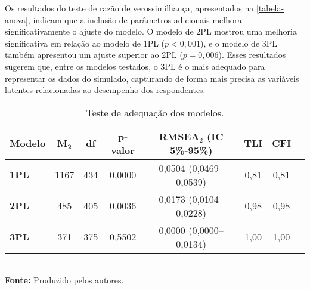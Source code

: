 Os resultados do teste de razão de verossimilhança, apresentados na \ref{tabela-anova}, indicam que a inclusão de parâmetros adicionais melhora significativamente o ajuste do modelo. O modelo de 2PL mostrou uma melhoria significativa em relação ao modelo de 1PL ($p < 0,001$), e o modelo de 3PL também apresentou um ajuste superior ao 2PL ($p = 0,006$). Esses resultados sugerem que, entre os modelos testados, o 3PL é o mais adequado para representar os dados do simulado, capturando de forma mais precisa as variáveis latentes relacionadas ao desempenho dos respondentes.
\begin{comment}
	conteúdo...\begin{table}[!htb]
		\centering
		\caption{Teste de adequação dos modelos. }
		\label{tabela-Mm2}
		\begin{tabular}{lcccccccc}
			\hline
			\textbf{Modelo} & \textbf{M}$_\textbf{2}$ & \textbf{df} &\textbf{ p-valor} & \textbf{
				
				
				
				$_\textbf{2}$} &
			\textbf{RMSEA$_{\text{5\%}}$} & \textbf{RMSEA$_{{\text{95\%}}}$} &
			\textbf{TLI} & \textbf{CFI} \\ 
			\hline 
			\textbf{1PL} & 1167 & 434 & 0,0000 & 0,0504 & 0,0469 & 0,0539 & 0,81 & 0,81 \\ 
			\hline
			\textbf{2PL} & 485 & 405 & 0,0036 & 0,0173 & 0,0104 & 0,0228 & 0,98 & 0,98 \\ 
			\hline
			\textbf{3PL} & 371 & 375 & 0,5502 & 0,0000 & 0,0000 & 0,0134 & 1,00 & 1,00 \\ 
			\hline
		\end{tabular}\\
		\vspace*{0.5cm}
		\small{\textbf{Fonte:} Produzido pelos autores.}
	\end{table}
\end{comment}


\begin{table}[!htb]
	\centering
	\caption{Teste de adequação dos modelos.}
	\label{tabela-m2}
	\begin{tabular}{lccccccc}
		\hline
		\textbf{Modelo} & \textbf{M}$_\textbf{2}$ & \textbf{df} & \textbf{p-valor} & \textbf{RMSEA$_2$ (IC 5\%-95\%)} & \textbf{TLI} & \textbf{CFI} \\ 
		\hline 
		\textbf{1PL} & 1167 & 434 & 0,0000 & 0,0504 (0,0469--0,0539) & 0,81 & 0,81 \\ 
		\hline
		\textbf{2PL} & 485 & 405 & 0,0036 & 0,0173 (0,0104--0,0228) & 0,98 & 0,98 \\ 
		\hline
		\textbf{3PL} & 371 & 375 & 0,5502 & 0,0000 (0,0000--0,0134) & 1,00 & 1,00 \\ 
		\hline
	\end{tabular}\\
	\vspace*{0.5cm}
	\small{\textbf{Fonte:} Produzido pelos autores.}
\end{table}


